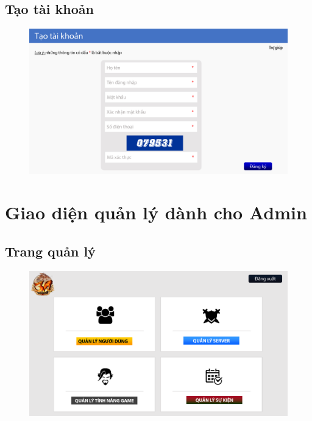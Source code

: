 \documentclass[3p]{elsarticle}
\begin{document}
\subsection{Tạo tài khoản}
\begin{figure}[!htbp]
	\centering
	\includegraphics[scale=.4]{images/signup.pdf}
\end{figure}
\section{Giao diện quản lý dành cho Admin}
\subsection{Trang quản lý}
\begin{figure}[!htbp]
	\centering
	\includegraphics[scale=.4]{images/manage.pdf}
\end{figure}
\newpage
\end{document}
